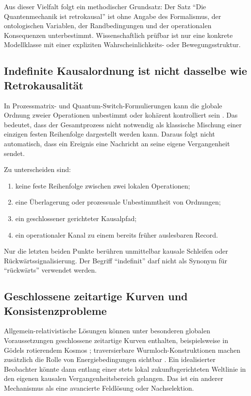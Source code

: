 \documentclass[11pt,a4paper]{article}
\theoremstyle{remark}
\begin{document}
Aus dieser Vielfalt folgt ein methodischer Grundsatz: Der Satz ``Die
Quantenmechanik ist retrokausal'' ist ohne Angabe des Formalismus, der
ontologischen Variablen, der Randbedingungen und der operationalen
Konsequenzen unterbestimmt. Wissenschaftlich prüfbar ist nur eine konkrete
Modellklasse mit einer expliziten Wahrscheinlichkeits- oder
Bewegungsstruktur.

\subsection{Indefinite Kausalordnung ist nicht dasselbe wie Retrokausalität}

In Prozessmatrix- und Quantum-Switch-Formulierungen kann die globale Ordnung
zweier Operationen unbestimmt oder kohärent kontrolliert sein
\citep{OreshkovCostaBrukner2012}. Das bedeutet, dass der Gesamtprozess nicht notwendig als
klassische Mischung einer einzigen festen Reihenfolge dargestellt werden
kann. Daraus folgt nicht automatisch, dass ein Ereignis eine Nachricht an
seine eigene Vergangenheit sendet.

Zu unterscheiden sind:
\begin{enumerate}
  \item keine feste Reihenfolge zwischen zwei lokalen Operationen;
  \item eine Überlagerung oder prozessuale Unbestimmtheit von Ordnungen;
  \item ein geschlossener gerichteter Kausalpfad;
  \item ein operationaler Kanal zu einem bereits früher auslesbaren Record.
\end{enumerate}
Nur die letzten beiden Punkte berühren unmittelbar kausale Schleifen oder
Rückwärts\-signalisierung. Der Begriff ``indefinit'' darf nicht als Synonym für
``rückwärts'' verwendet werden.

\subsection{Geschlossene zeitartige Kurven und Konsistenzprobleme}

Allgemein-relativistische Lösungen können unter besonderen globalen
Voraussetzungen geschlossene zeitartige Kurven enthalten, beispielsweise in
Gödels rotierendem Kosmos \citep{Goedel1949}; traversierbare
Wurmloch-Konstruktionen machen zusätzlich die Rolle von Energiebedingungen
sichtbar \citep{MorrisThorneYurtsever1988}. Ein idealisierter
Beobachter könnte dann entlang einer stets lokal zukunftsgerichteten Weltlinie
in den eigenen kausalen Vergangenheitsbereich gelangen. Das ist ein anderer
Mechanismus als eine avancierte Feldlösung oder Nachselektion.
\end{document}
